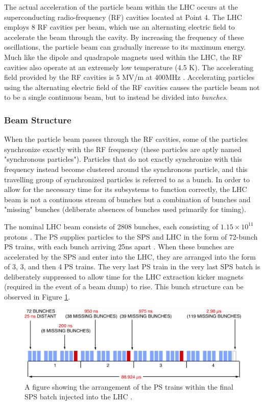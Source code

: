 \documentclass[12pt,a4paper,epsf,portrait,times,epsfig]{article}
\begin{document}
		The actual acceleration of the particle beam within the LHC occurs at the superconducting radio-frequency (RF) cavities located at Point 4. The LHC employs 8 RF cavities per beam, which use an alternating electric field to accelerate the beam through the cavity. By increasing the frequency of these oscillations, the particle beam can gradually increase to its maximum energy. Much like the dipole and quadrapole magnets used within the LHC, the RF cavities also operate at an extremely low temperature (4.5 K). The accelerating field provided by the RF cavities is 5 MV/m at 400MHz \cite{LHCRF}. Accelerating particles using the alternating electric field of the RF cavities causes the particle beam not to be a single continuous beam, but to instead be divided into \textit{bunches}.
		
		\subsubsection{Beam Structure}
		

		When the particle beam passes through the RF cavities, some of the particles synchronize exactly with the RF frequency (these particles are aptly named "synchronous particles"). Particles that do not exactly synchronize with this frequency instead become clustered around the synchronous particle, and this travelling group of synchronized particles is referred to as a bunch. In order to allow for the necessary time for its subsystems to function correctly, the LHC beam is not a continuous stream of bunches but a combination of bunches and "missing" bunches (deliberate absences of bunches used primarily for timing). \par

		The nominal LHC beam consists of 2808 bunches, each consisting of $1.15 \times 10^{11}$ protons \cite{LHCDesignV1,LHCDesignV3}. The PS supplies particles to the SPS and LHC in the form of 72-bunch PS trains, with each bunch arriving 25ns apart \cite{LHCBeam}. When these bunches are accelerated by the SPS and enter into the LHC, they are arranged into the form of 3, 3, and then 4 PS trains. The very last PS train in the very last SPS batch is deliberately suppressed to allow time for the LHC extraction kicker magnets (required in the event of a beam dump) to rise. This bunch structure can be observed in Figure \ref{Fig:LHCBunches}. 

		\begin{figure}
			\centering
			\includegraphics[scale=0.3]{LHC_Beam_Structure}
			\caption{A figure showing the arrangement of the PS trains within the final SPS batch injected into the LHC \cite{LHCBunches}.}
			\label{Fig:LHCBunches}
		\end{figure}
\end{document}
